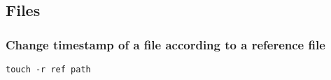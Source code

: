 \subsection{Files}
\subsubsection{Change timestamp of a file according to a reference file}
\verb|touch -r ref path|
